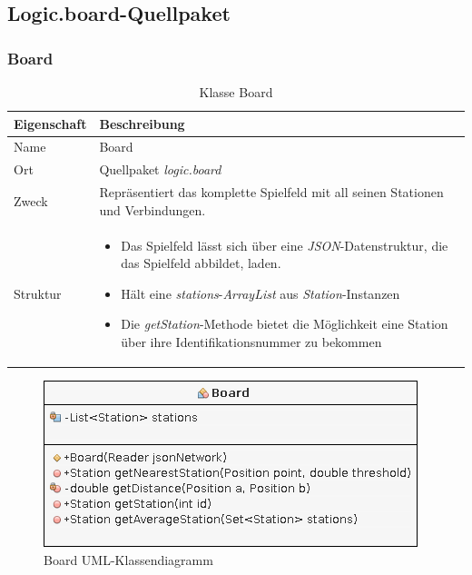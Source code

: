 \subsection{Logic.board-Quellpaket}
        \subsubsection{Board}
            \begin{table}[H]
                \caption{Klasse Board}
                \begin{tabular}{p{2.5cm}  p{9.5cm}} 
                    \hline
                    \textbf{Eigenschaft} & \textbf{Beschreibung}\\
                    \hline
                    Name & Board\\
                    Ort & Quellpaket \textit{logic.board}\\
                    \hline
                    Zweck &
                    Repräsentiert das komplette Spielfeld mit all seinen Stationen und Verbindungen.
                    \\
                    \hline
                    Struktur &
                    \begin{itemize}
                        \itemsep0em
                        \item Das Spielfeld lässt sich über eine \textit{JSON}-Datenstruktur, die das Spielfeld abbildet, laden.
                        \item Hält eine \textit{stations}-\textit{ArrayList} aus \textit{Station}-Instanzen
                        \item Die \textit{getStation}-Methode bietet die Möglichkeit eine Station über ihre Identifikationsnummer zu bekommen
                    \end{itemize}
                    \\
                    \hline
                \end{tabular}
            \end{table}
            \begin{figure}[H]
                \centering
                \includegraphics[scale=0.7]{img/uml/board.png}   
                \caption{Board UML-Klassendiagramm}
            \end{figure}


